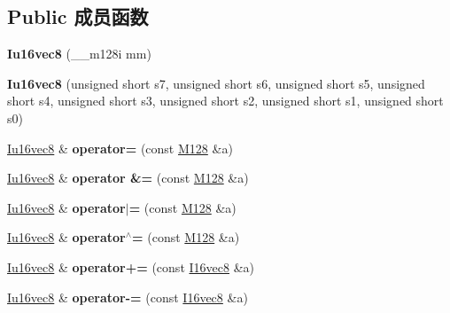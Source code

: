 \subsection*{Public 成员函数}
\begin{DoxyCompactItemize}
\item 
\mbox{\label{class_iu16vec8_a4777df2a298df92e4a938b4ee7e44b28}} 
{\bfseries Iu16vec8} (\+\_\+\+\_\+m128i mm)
\item 
\mbox{\label{class_iu16vec8_abb7a0b65fdd688ab46d8bfc5705c46f9}} 
{\bfseries Iu16vec8} (unsigned short s7, unsigned short s6, unsigned short s5, unsigned short s4, unsigned short s3, unsigned short s2, unsigned short s1, unsigned short s0)
\item 
\mbox{\label{class_iu16vec8_a6eabd06a1d558f77f19df551073af5bb}} 
\hyperlink{class_iu16vec8}{Iu16vec8} \& {\bfseries operator=} (const \hyperlink{class_m128}{M128} \&a)
\item 
\mbox{\label{class_iu16vec8_afe44b31430316f66adbd722d3d746a42}} 
\hyperlink{class_iu16vec8}{Iu16vec8} \& {\bfseries operator \&=} (const \hyperlink{class_m128}{M128} \&a)
\item 
\mbox{\label{class_iu16vec8_a823a71277655c2539d15e4218ef678c1}} 
\hyperlink{class_iu16vec8}{Iu16vec8} \& {\bfseries operator$\vert$=} (const \hyperlink{class_m128}{M128} \&a)
\item 
\mbox{\label{class_iu16vec8_af52e15fd3d5d8690dae1417a850af624}} 
\hyperlink{class_iu16vec8}{Iu16vec8} \& {\bfseries operator$^\wedge$=} (const \hyperlink{class_m128}{M128} \&a)
\item 
\mbox{\label{class_iu16vec8_a2bf45214bec1a2089e621fbba0bf5af5}} 
\hyperlink{class_iu16vec8}{Iu16vec8} \& {\bfseries operator+=} (const \hyperlink{class_i16vec8}{I16vec8} \&a)
\item 
\mbox{\label{class_iu16vec8_a41af6307531f4a51fde1d1410a5a3d7e}} 
\hyperlink{class_iu16vec8}{Iu16vec8} \& {\bfseries operator-\/=} (const \hyperlink{class_i16vec8}{I16vec8} \&a)
\item 
\mbox{\label{class_iu16vec8_a7d442d927726116bc8c04484d30c3846}} 

\end{DoxyCompactItemize}
